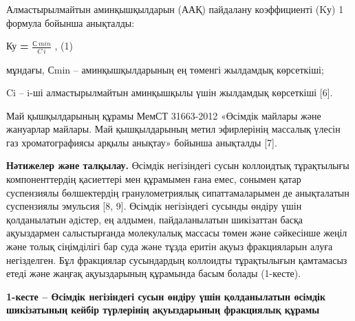 Алмастырылмайтын аминқышқылдарын (ААҚ) пайдалану коэффициенті (Kу) 1
формула бойынша анықталды:

Ку {\bfseries =} \(\frac{С\ min}{C\ i}\) , (1)

мұндағы, Сmin -- аминқышқылдарының ең төменгі жылдамдық көрсеткіші;

Ci -- i-ші алмастырылмайтын аминқышқылы үшін жылдамдық көрсеткіші
{[}6{]}.

Май қышқылдарының құрамы МемСТ 31663-2012 «Өсімдік майлары және
жануарлар майлары. Май қышқылдарының метил эфирлерінің массалық үлесін
газ хроматографиясы арқылы анықтау» бойынша анықталды {[}7{]}.

{\bfseries Нәтижелер және талқылау.} Өсімдік негізіндегі сусын коллоидтық
тұрақтылығы компоненттердің қасиеттері мен құрамымен ғана емес, сонымен
қатар суспензиялы бөлшектердің гранулометриялық сипаттамаларымен де
анықталатын суспензиялы эмульсия {[}8, 9{]}. Өсімдік негізіндегі сусынды
өндіру үшін қолданылатын әдістер, ең алдымен, пайдаланылатын шикізаттан
басқа ақуыздармен салыстырғанда молекулалық массасы төмен және
сәйкесінше жеңіл және толық сіңімділігі бар суда және тұзда еритін ақуыз
фракцияларын алуға негізделген. Бұл фракциялар сусындардың коллоидты
тұрақтылығын қамтамасыз етеді және жаңғақ ақуыздарының құрамында басым
болады (1-кесте).

{\bfseries 1-кесте -- Өсімдік негізіндегі сусын өндіру үшін қолданылатын
өсімдік шикізатының кейбір түрлерінің ақуыздарының фракциялық құрамы}

